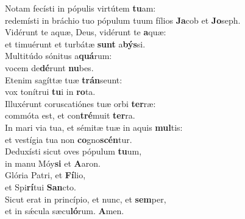 \evenverse Notam fecísti in pópulis virtútem \textbf{tu}am:~\*\\
\evenverse redemísti in bráchio tuo pópulum tuum fílios \textbf{Ja}cob et \textbf{Jo}seph.\\
\oddverse Vidérunt te aquæ, Deus, vidérunt te \textbf{a}quæ:~\*\\
\oddverse et timuérunt et turbátæ \textbf{sunt} a\textbf{býs}si.\\
\evenverse Multitúdo sónitus a\textbf{quá}rum:~\*\\
\evenverse vocem de\textbf{dé}runt \textbf{nu}bes.\\
\oddverse Etenim sagíttæ tuæ \textbf{trán}seunt:~\*\\
\oddverse vox tonítrui \textbf{tu}i in \textbf{ro}ta.\\
\evenverse Illuxérunt coruscatiónes tuæ orbi \textbf{ter}ræ:~\*\\
\evenverse commóta est, et con\textbf{tré}muit \textbf{ter}ra.\\
\oddverse In mari via tua, et sémitæ tuæ in aquis \textbf{mul}tis:~\*\\
\oddverse et vestígia tua non \textbf{co}gno\textbf{scén}tur.\\
\evenverse Deduxísti sicut oves pópulum \textbf{tu}um,~\*\\
\evenverse in manu Móy\textbf{si} et \textbf{A}aron.\\
\oddverse Glória Patri, et \textbf{Fí}lio,~\*\\
\oddverse et Spi\textbf{rí}tui \textbf{San}cto.\\
\evenverse Sicut erat in princípio, et nunc, et \textbf{sem}per,~\*\\
\evenverse et in sǽcula sæcu\textbf{ló}rum. \textbf{A}men.\\
